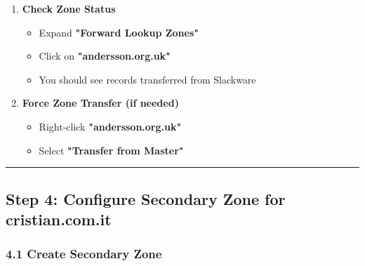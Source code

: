 \begin{enumerate}
\def\labelenumi{\arabic{enumi}.}
\tightlist
\item
  \textbf{Check Zone Status}

  \begin{itemize}
  \tightlist
  \item
    Expand \textbf{"Forward Lookup Zones"}
  \item
    Click on \textbf{"andersson.org.uk"}
  \item
    You should see records transferred from Slackware
  \end{itemize}
\item
  \textbf{Force Zone Transfer (if needed)}

  \begin{itemize}
  \tightlist
  \item
    Right-click \textbf{"andersson.org.uk"}
  \item
    Select \textbf{"Transfer from Master"}
  \end{itemize}
\end{enumerate}

\begin{center}\rule{0.5\linewidth}{0.5pt}\end{center}

\subsection{Step 4: Configure Secondary Zone for cristian.com.it}\label{step-4-configure-secondary-zone-for-cristian.com.it}

\subsubsection{4.1 Create Secondary Zone}\label{create-secondary-zone-cristian}

